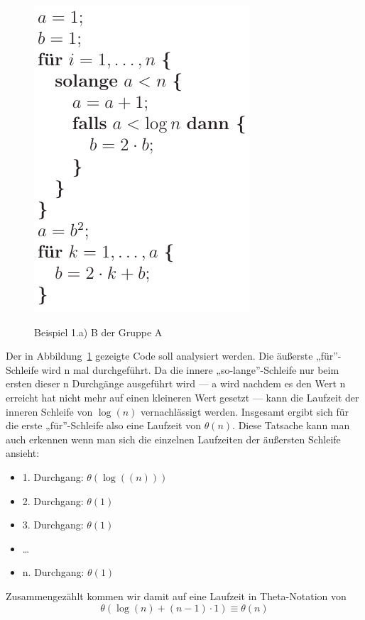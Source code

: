 \documentclass[a4paper, 12pt]{article}
\begin{document}
\begin{figure}[htbp]
	\caption{Beispiel 1.a) B der Gruppe A}
	\vskip 0.2cm
	\centering
	\includegraphics{Figures/Test_2011_04_15_AaB}
	\label{figure:Test_2011_04_15_AaB}
\end{figure}

Der in Abbildung~\ref{figure:Test_2011_04_15_AaB} gezeigte Code soll analysiert werden. Die äußerste „für”-Schleife wird n mal durchgeführt. Da die innere „so-lange”-Schleife nur beim ersten dieser n Durchgänge ausgeführt wird — a wird nachdem es den Wert n erreicht hat nicht mehr auf einen kleineren Wert gesetzt — kann die Laufzeit der inneren Schleife von $\log(n)$ vernachlässigt werden. Insgesamt ergibt sich für die erste „für”-Schleife also eine Laufzeit von $θ(n)$. Diese Tatsache kann man auch erkennen wenn man sich die einzelnen Laufzeiten der äußersten Schleife ansieht:

\begin{itemize}
	\item 1. Durchgang: $θ\left(\log(\left(n\right)) \right)$
	\item 2. Durchgang: $θ(1)$
	\item 3. Durchgang: $θ(1)$
	\item \dots
	\item n. Durchgang: $θ(1)$
\end{itemize}

Zusammengezählt kommen wir damit auf eine Laufzeit in Theta-Notation von \[θ\left(\log(n)+\left(n-1\right)⋅ 1\right) \equiv θ\left(n\right)\]
\end{document}
